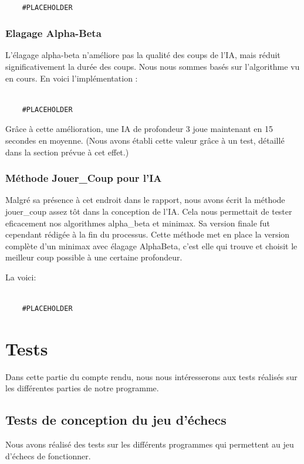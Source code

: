 \documentclass{article}
\begin{document}
\begin{verbatim}

    #PLACEHOLDER
\end{verbatim}


\subsubsection{Elagage Alpha-Beta}
L'élagage alpha-beta n'améliore pas la qualité des coups de l'IA, mais réduit significativement la durée des coups.
Nous nous sommes basés sur l'algorithme vu en cours.
En voici l'implémentation :
\begin{verbatim}

    #PLACEHOLDER
\end{verbatim}
Grâce à cette amélioration, une IA de profondeur 3 joue maintenant en 15 secondes en moyenne. (Nous avons établi cette
valeur grâce à un test, détaillé dans la section prévue à cet effet.)
\subsubsection{Méthode Jouer\_Coup pour l'IA}
Malgré sa présence à cet endroit dans le rapport, nous avons écrit la méthode jouer\_coup assez tôt dans la conception de l'IA.
Cela nous permettait de tester eficacement nos algorithmes alpha\_beta et minimax.
Sa version finale fut cependant rédigée à la fin du processus.
Cette méthode met en place la version complète d'un minimax avec élagage Alpha\-Beta, c'est elle qui
trouve et choisit le meilleur coup possible à une certaine profondeur.

La voici:
\begin{verbatim}

    #PLACEHOLDER
\end{verbatim}

\section{Tests}
Dans cette partie du compte rendu, nous nous intéresserons aux tests réalisés sur les différentes parties de notre programme.

\subsection{Tests de conception du jeu d'échecs}
Nous avons réalisé des tests sur les différents programmes qui permettent au jeu d'échecs de fonctionner.
\end{document}
